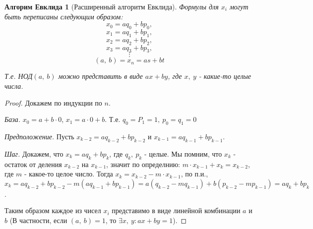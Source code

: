 \documentclass[a4paper,12pt]{article}
\newtheorem*{Evc} {Алгорим Евклида}
\begin{document}
		\begin{Evc}[Расширенный алгоритм Евклида] 
			Формулы для $x_i$ могут быть переписаны следующим образом:
			$$x_0 = aq_0 + bp_0,$$
			$$x_1 = aq_1 + bp_1,$$
			$$x_2 = aq_2 + bp_2,$$
			$$x_3 = aq_3 + bp_3,$$
	 		$$\vdots$$
			$$(a,\ b) = x_n = as + bt$$

            Т.е. НОД$(a,\ b)$ можно представить в виде $ax + by$, где $x,\ y$ - какие-то целые числа.
		\end{Evc}
		\begin{proof}
			Докажем по индукции по $n$. 

			\textit{База.} $x_0 = a + b \cdot 0$, $x_1 = a \cdot 0 + b$. Т.е. $q_0 = P_1 = 1,\ p_0 = q_1 = 0$

			\textit{Предположение.} Пусть $x_{k - 2} = aq_{k - 2} + bp_{k - 2}$ и $x_{k - 1} = aq_{k - 1} + bp_{k - 1}$.

			\textit{Шаг.} Докажем, что $x_k = aq_{k} + bp_{k}$, где $q_k,\ p_k$ - целые. Мы помним, что $x_k$ - остаток от деления $x_{k - 2}$ на $x_{k - 1}$, значит по определнию: $m\cdot x_{k - 1} + x_k = x_{k - 2}$, где $m$ - какое-то целое число. Тогда $x_k = x_{k - 2} - m \cdot x_{k - 1}$, по п.и., $x_k = aq_{k - 2} + bp_{k - 2} - m(aq_{k - 1} + bp_{k - 1}) = a(q_{k - 2} - mq_{k - 1}) + b(p_{k - 2} - mp_{k - 1}) = aq_{k} + bp_{k}$.

			Таким образом каждое из чисел $x_i$ представимо в виде линейной комбинации $a$ и $b$ (В частности, если $(a,\ b) = 1$, то $\exists x,\ y: ax + by = 1$).
		\end{proof}
\end{document}
